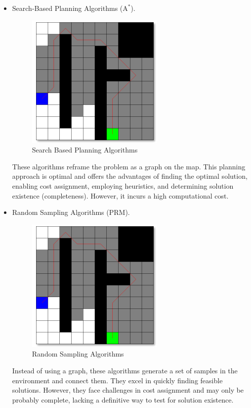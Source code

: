 \begin{itemize}
    \item Search-Based Planning Algorithms ($\text{A}^\ast$). 
        \begin{figure}[H]
            \centering
            \includegraphics[width=0.75\linewidth]{images/sb.png}
            \caption{Search Based Planning Algorithms}
        \end{figure}
        These algorithms reframe the problem as a graph on the map. 
        This planning approach is optimal and offers the advantages of finding the optimal solution, enabling cost assignment, employing heuristics, and determining solution existence (completeness). 
        However, it incurs a high computational cost.
    \item Random Sampling Algorithms (PRM). 
        \begin{figure}[H]
            \centering
            \includegraphics[width=0.75\linewidth]{images/sb.png}
            \caption{Random Sampling Algorithms}
        \end{figure}
        Instead of using a graph, these algorithms generate a set of samples in the environment and connect them. 
        They excel in quickly finding feasible solutions.
        However, they face challenges in cost assignment and may only be probably complete, lacking a definitive way to test for solution existence.
\end{itemize}